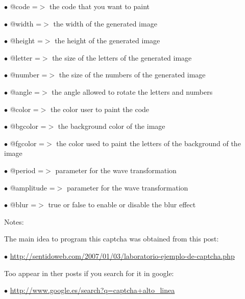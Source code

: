 \documentclass[a4paper]{article}
\def\htmladdnormallink#1#2{\href{#2}{#1}}
\begin{document}
\begin{compactitem}
\item[\color{myblue}$\bullet$] @code      =$>$ the code that you want to paint
\item[\color{myblue}$\bullet$] @width     =$>$ the width of the generated image
\item[\color{myblue}$\bullet$] @height    =$>$ the height of the generated image
\item[\color{myblue}$\bullet$] @letter    =$>$ the size of the letters of the generated image
\item[\color{myblue}$\bullet$] @number    =$>$ the size of the numbers of the generated image
\item[\color{myblue}$\bullet$] @angle     =$>$ the angle allowed to rotate the letters and numbers
\item[\color{myblue}$\bullet$] @color     =$>$ the color user to paint the code
\item[\color{myblue}$\bullet$] @bgcolor   =$>$ the background color of the image
\item[\color{myblue}$\bullet$] @fgcolor   =$>$ the color used to paint the letters of the background of the image
\item[\color{myblue}$\bullet$] @period    =$>$ parameter for the wave transformation
\item[\color{myblue}$\bullet$] @amplitude =$>$ parameter for the wave transformation
\item[\color{myblue}$\bullet$] @blur      =$>$ true or false to enable or disable the blur effect
\end{compactitem}

Notes:

The main idea to program this captcha was obtained from this post:

\begin{compactitem}
\item[\color{myblue}$\bullet$] \htmladdnormallink{http://sentidoweb.com/2007/01/03/laboratorio-ejemplo-de-captcha.php}{http://sentidoweb.com/2007/01/03/laboratorio-ejemplo-de-captcha.php}
\end{compactitem}

Too appear in ther posts if you search for it in google:

\begin{compactitem}
\item[\color{myblue}$\bullet$] \htmladdnormallink{http://www.google.es/search?q=captcha+alto\_linea}{http://www.google.es/search?q=captcha+alto\_linea}
\end{compactitem}
\end{document}

